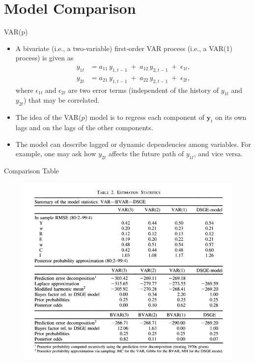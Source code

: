 \documentclass{beamer}
\begin{document}
\section{Model Comparison} 

\begin{frame}{VAR(p)}
\begin{itemize}
    \item A bivariate (i.e., a two‐variable) first‐order VAR process (i.e., a VAR(1) process) is given as
    \[
    \begin{aligned}
    y_{1t} &= a_{11}\,y_{1,t-1} \;+\; a_{12}\,y_{2,t-1} \;+\; \epsilon_{1t},\\
    y_{2t} &= a_{21}\,y_{1,t-1} \;+\; a_{22}\,y_{2,t-1} \;+\; \epsilon_{2t},
    \end{aligned}
    \]
    where $\epsilon_{1t}$ and $\epsilon_{2t}$ are two error terms (independent of the history of $y_{1t}$ and $y_{2t}$) that may be correlated.
\end{itemize}

\begin{itemize}
    \item The idea of the VAR($p$) model is to regress each component of $\mathbf{y}_t$ on its own lags and on the lags of the other components.
    \item The model can describe lagged or dynamic dependencies among variables. For example, one may ask how $y_{2t}$ affects the future path of $y_{1t}$, and vice versa.
\end{itemize}
\end{frame}

\begin{frame}{Comparison Table}
\begin{figure}
    \centering
    \includegraphics[width=1\linewidth]{images/comparison_table.png}
    \label{fig:enter-label}
\end{figure}
\end{frame}
\end{document}
